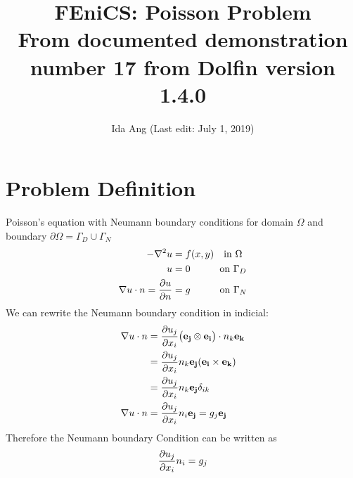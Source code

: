 \documentclass[12pt,3p]{article}
\begin{document}
\title{FEniCS: Poisson Problem \\
	\large{From documented demonstration number 17 from Dolfin version 1.4.0}}
\author{Ida Ang (Last edit: July 1, 2019)}
\date{\vspace{-5ex}}
\maketitle

\section{Problem Definition}
Poisson's equation with Neumann boundary conditions for domain $\Omega$ and boundary $\partial \Omega = \Gamma_D \cup \Gamma_N$
\begin{align}\label{ProbDef1}
\begin{split}
- \nabla^2 u &= f(x,y) \quad \text{in } \Omega \\
		u &= 0 \quad \quad \quad \text{on } \Gamma_D \\
\nabla u \cdot n = \pdv{u}{n} &= g \quad \quad \quad \text{on } \Gamma_N
\end{split}
\end{align}
We can rewrite the Neumann boundary condition in indicial: 
\begin{align}\label{NBoundInd}
\begin{split}
\nabla u \cdot n &= \pdv{u_j}{x_i} \big( \mathbf{e_j} \otimes \mathbf{e_i} \big) \cdot n_k \mathbf{e_k} \\
			&= \pdv{u_j}{x_i} n_k \mathbf{e_j} (\mathbf{e_i} \times \mathbf{e_k}) \\
			&= \pdv{u_j}{x_i} n_k \mathbf{e_j} \delta_{ik} \\
\nabla u \cdot n &= \pdv{u_j}{x_i} n_i \mathbf{e_j} = g_j \mathbf{e_j}
\end{split}
\end{align}
Therefore the Neumann boundary Condition can be written as 
\begin{equation}\label{NBoundInd}
\pdv{u_j}{x_i} n_i  = g_j
\end{equation}
\end{document}
